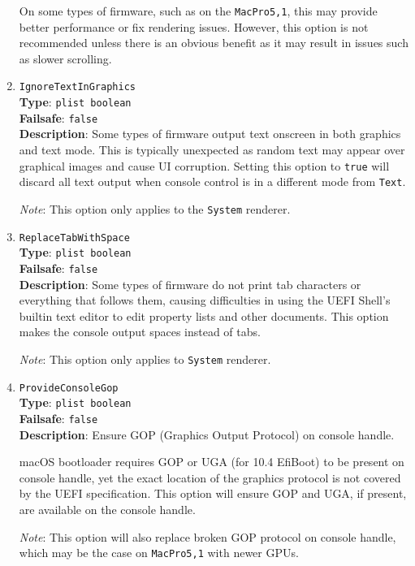 \documentclass[]{article}
\begin{document}
\begin{enumerate}
  On some types of firmware, such as on the \texttt{MacPro5,1}, this may provide better
  performance or fix rendering issues. However, this option is not recommended unless
  there is an obvious benefit as it may result in issues such as slower scrolling.

\item
  \texttt{IgnoreTextInGraphics}\\
  \textbf{Type}: \texttt{plist\ boolean}\\
  \textbf{Failsafe}: \texttt{false}\\
  \textbf{Description}: Some types of firmware output text onscreen in both graphics and
  text mode. This is typically unexpected as random text may appear over
  graphical images and cause UI corruption. Setting this option to \texttt{true} will
  discard all text output when console control is in a different mode from \texttt{Text}.

  \emph{Note}: This option only applies to the \texttt{System} renderer.

\item
  \texttt{ReplaceTabWithSpace}\\
  \textbf{Type}: \texttt{plist\ boolean}\\
  \textbf{Failsafe}: \texttt{false}\\
  \textbf{Description}: Some types of firmware do not print tab characters or everything
  that follows them, causing difficulties in using the UEFI Shell's builtin
  text editor to edit property lists and other documents. This option makes the console
  output spaces instead of tabs.

  \emph{Note}: This option only applies to \texttt{System} renderer.

\item
  \texttt{ProvideConsoleGop}\\
  \textbf{Type}: \texttt{plist\ boolean}\\
  \textbf{Failsafe}: \texttt{false}\\
  \textbf{Description}: Ensure GOP (Graphics Output Protocol) on console handle.

  macOS bootloader requires GOP or UGA (for 10.4 EfiBoot) to be present on console
  handle, yet the exact location of the graphics protocol is not covered by the
  UEFI specification. This option will ensure GOP and UGA, if present, are available
  on the console handle.

  \emph{Note}: This option will also replace broken GOP protocol on console handle,
  which may be the case on \texttt{MacPro5,1} with newer GPUs.


\end{enumerate}
\end{document}
